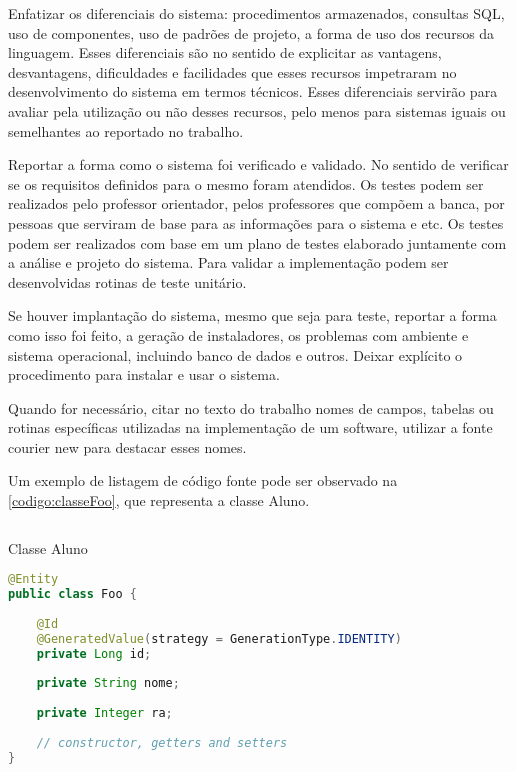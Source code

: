 Enfatizar os diferenciais do sistema: procedimentos armazenados, consultas SQL, uso de componentes, uso de padrões de projeto, a forma de uso dos recursos da linguagem. Esses diferenciais são no sentido de explicitar as vantagens, desvantagens, dificuldades e facilidades que esses recursos impetraram no desenvolvimento do sistema em termos técnicos. Esses diferenciais servirão para avaliar pela utilização ou não desses recursos, pelo menos para sistemas iguais ou semelhantes ao reportado no trabalho.

Reportar a forma como o sistema foi verificado e validado. No sentido de verificar se os requisitos definidos para o mesmo foram atendidos. Os testes podem ser realizados pelo professor orientador, pelos professores que compõem a banca, por pessoas que serviram de base para as informações para o sistema e etc. Os testes podem ser realizados com base em um plano de testes elaborado juntamente com a análise e projeto do sistema. Para validar a implementação podem ser desenvolvidas rotinas de teste unitário.

Se houver implantação do sistema, mesmo que seja para teste, reportar a forma como isso foi feito, a geração de instaladores, os problemas com ambiente e sistema operacional, incluindo banco de dados e outros. Deixar explícito o procedimento para instalar e usar o sistema.

Quando for necessário, citar no texto do trabalho nomes de campos, tabelas ou rotinas específicas utilizadas na implementação de um software, utilizar a fonte courier new para destacar esses nomes.

Um exemplo de listagem de código fonte pode ser observado na \autoref{codigo:classeFoo}, que representa a classe Aluno.

\begin{sourcecode}[htb]
    \caption{\label{codigo:classeFoo}Classe Aluno}
    \begin{lstlisting}[frame=single, language=Java]
@Entity
public class Foo {
 
    @Id
    @GeneratedValue(strategy = GenerationType.IDENTITY)
    private Long id;
 
    private String nome;
    
    private Integer ra;
     
    // constructor, getters and setters
}
\end{lstlisting}
    \fonte{}
\end{sourcecode}

